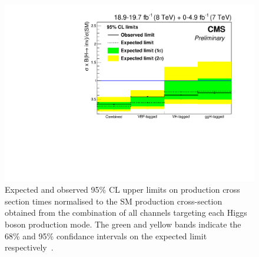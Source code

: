 \begin{figure}
  \includegraphics[width=\largefigwidth]{plots/comb/HIG-15-012-figs/channellimit.pdf}
  \caption{Expected and observed 95\% \ac{CL} upper limits on production cross section times \BRinv normalised to the \ac{SM} production cross-section obtained from the combination of all channels targeting each Higgs boson production mode. The green and yellow bands indicate the 68\% and 95\% confidance intervals on the expected limit respectively~\cite{CMS-PAS-HIG-15-012}.}
  \label{fig:parkedcombchannel}
\end{figure}

